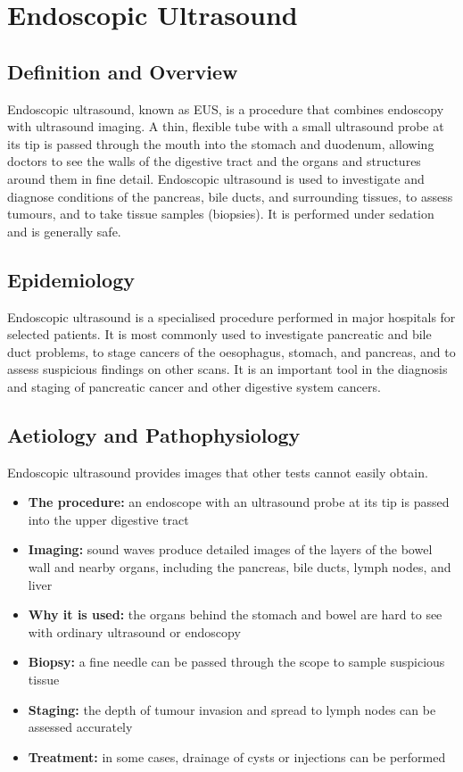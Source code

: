 \chapter{Endoscopic Ultrasound}

\section*{Definition and Overview}
Endoscopic ultrasound, known as EUS, is a procedure that combines endoscopy with ultrasound imaging. A thin, flexible tube with a small ultrasound probe at its tip is passed through the mouth into the stomach and duodenum, allowing doctors to see the walls of the digestive tract and the organs and structures around them in fine detail. Endoscopic ultrasound is used to investigate and diagnose conditions of the pancreas, bile ducts, and surrounding tissues, to assess tumours, and to take tissue samples (biopsies). It is performed under sedation and is generally safe.

\section*{Epidemiology}
Endoscopic ultrasound is a specialised procedure performed in major hospitals for selected patients. It is most commonly used to investigate pancreatic and bile duct problems, to stage cancers of the oesophagus, stomach, and pancreas, and to assess suspicious findings on other scans. It is an important tool in the diagnosis and staging of pancreatic cancer and other digestive system cancers.

\section*{Aetiology and Pathophysiology}
Endoscopic ultrasound provides images that other tests cannot easily obtain.
\begin{itemize}
    \item \textbf{The procedure:} an endoscope with an ultrasound probe at its tip is passed into the upper digestive tract
    \item \textbf{Imaging:} sound waves produce detailed images of the layers of the bowel wall and nearby organs, including the pancreas, bile ducts, lymph nodes, and liver
    \item \textbf{Why it is used:} the organs behind the stomach and bowel are hard to see with ordinary ultrasound or endoscopy
    \item \textbf{Biopsy:} a fine needle can be passed through the scope to sample suspicious tissue
    \item \textbf{Staging:} the depth of tumour invasion and spread to lymph nodes can be assessed accurately
    \item \textbf{Treatment:} in some cases, drainage of cysts or injections can be performed
\end{itemize}


